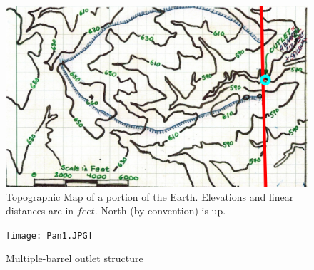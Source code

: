 \documentclass[12pt]{article}
\begin{document}
\begin{enumerate}
\begin{figure}[h!] %
   \centering
   \includegraphics[width=6.5in]{topoMap.jpg} 
   \caption{Topographic Map of a portion of the Earth.  Elevations and linear distances are in $feet$. North (by convention) is up.}
   \label{fig:topoMap.jpg}
\end{figure}

\begin{figure}[h!] %
   \centering
   \texttt{[image: Pan1.JPG]} 
   \caption{Multiple-barrel outlet structure}
   \label{fig:Pan1.JPG}
\end{figure}
\clearpage


\end{enumerate}
\end{document}
